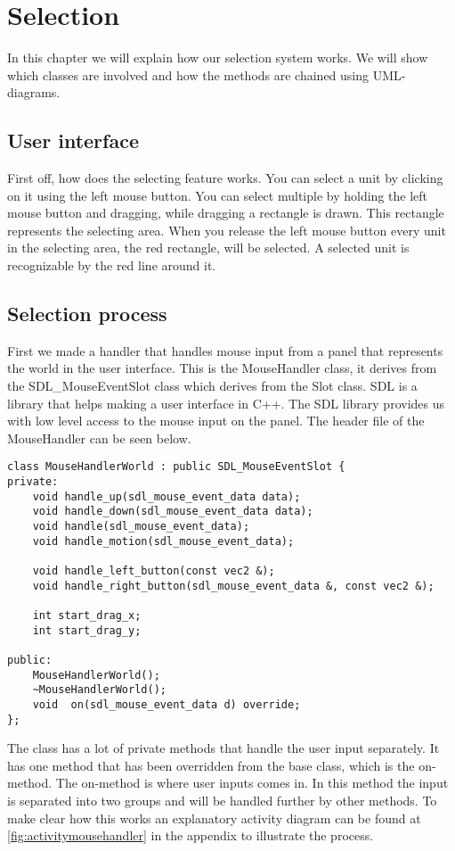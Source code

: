 \section{Selection}
In this chapter we will explain how our selection system works. We will show which classes are involved and how the methods are chained using UML-diagrams. 

\subsection{User interface}
First off, how does the selecting feature works. You can select a unit by clicking on it using the left mouse button. You can select multiple by holding the left mouse button and dragging, while dragging a rectangle is drawn. This rectangle represents the selecting area. When you release the left mouse button every unit in the selecting area, the red rectangle, will be selected. A selected unit is recognizable by the red line around it.

\subsection{Selection process}
First we made a handler that handles mouse input from a panel that represents the world in the user interface. This is the MouseHandler class, it derives from the SDL\_MouseEventSlot class which derives from the Slot class. SDL is a library that helps making a user interface in C++. The SDL library provides us with low level access to the mouse input on the panel. The header file of the MouseHandler can be seen below.

\begin{lstlisting}
class MouseHandlerWorld : public SDL_MouseEventSlot {
private:
    void handle_up(sdl_mouse_event_data data);
    void handle_down(sdl_mouse_event_data data);
    void handle(sdl_mouse_event_data);
    void handle_motion(sdl_mouse_event_data);

    void handle_left_button(const vec2 &);
    void handle_right_button(sdl_mouse_event_data &, const vec2 &);

    int start_drag_x;
    int start_drag_y;

public:
    MouseHandlerWorld();
    ~MouseHandlerWorld();
    void  on(sdl_mouse_event_data d) override;
};
\end{lstlisting}

The class has a lot of private methods that handle the user input separately. It has one method that has been overridden from the base class, which is the on-method. The on-method is where user inputs comes in. In this method the input is separated into two groups and will be handled further by other methods. To make clear how this works an explanatory activity diagram can be found at \cref{fig:activitymousehandler} in the appendix to illustrate the process. 

